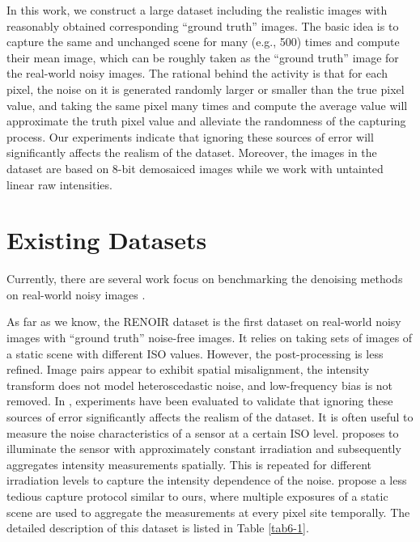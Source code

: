 In this work, we construct a large dataset including the realistic images with reasonably obtained corresponding ``ground truth'' images. The basic idea is to capture the same and unchanged scene for many (e.g., 500) times and compute their mean image, which can be roughly taken as the ``ground truth'' image for the real-world noisy images. The rational behind the activity is that for each pixel, the noise on it is generated randomly larger or smaller than the true pixel value, and taking the same pixel many times and compute the average value will approximate the truth pixel value and alleviate the randomness of the capturing process. Our experiments indicate that ignoring these sources of error will significantly affects the realism of the dataset. Moreover, the images in the dataset \cite{crosschannel2016} are based on $8$-bit demosaiced images while we work with untainted linear raw intensities.

\section{Existing Datasets}

Currently, there are several work focus on benchmarking the denoising methods on real-world noisy images \cite{RENOIR2014,crosschannel2016,dnd2017}.

As far as we know, the RENOIR dataset \cite{RENOIR2014} is the first dataset on real-world noisy images with ``ground truth'' noise-free images. It relies on taking sets of images of a static scene with different ISO values. However, the post-processing is less refined. Image pairs appear to exhibit spatial misalignment, the intensity transform does not model heteroscedastic noise, and low-frequency bias is not removed. In \cite{RENOIR2014}, experiments have been evaluated to validate that ignoring these sources of error significantly
affects the realism of the dataset. It is often useful to measure the noise characteristics of a sensor at a certain ISO level. \cite{RENOIR2014} proposes to illuminate the sensor with approximately constant irradiation and subsequently aggregates intensity measurements spatially. This is repeated for different irradiation levels to capture the intensity dependence of the noise. \cite{RENOIR2014} propose a less tedious capture protocol similar to ours, where multiple exposures of a static scene are used to aggregate the measurements at every pixel site temporally. The detailed description of this dataset is listed in Table \ref{tab6-1}. 

